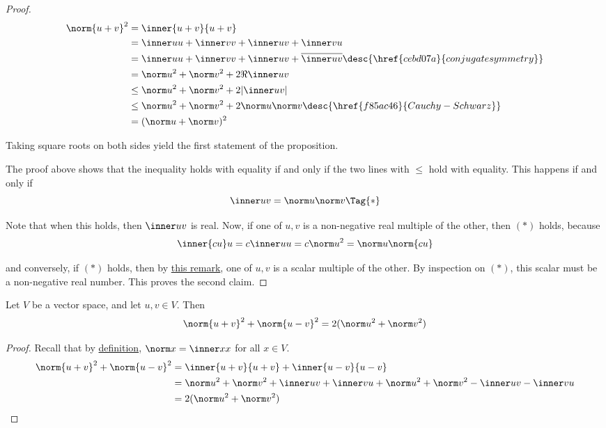 \begin{proof}
  \begin{align*}
    \norm{u+v}^2 &=\inner{u+v}{u+v}                                                                            \\
                 &=\inner uu+\inner vv+\inner uv+\inner vu                                                     \\
                 &=\inner uu+\inner vv+\inner uv+\overline{\inner uv}\desc{\href{cebd07a}{conjugate symmetry}} \\
                 &=\norm u^2+\norm v^2+2\Re\inner uv                                                           \\
                 &\leq\norm u^2+\norm v^2+2|\inner uv|                                                         \\
                 &\leq\norm u^2+\norm v^2+2\norm u\norm v\desc{\href{f85ac46}{Cauchy-Schwarz}}                 \\
                 &=(\norm u+\norm v)^2
  \end{align*}

  Taking square roots on both sides yield the first statement of the
  proposition.

  The proof above shows that the inequality holds with equality if and only if
  the two lines with $\leq$ hold with equality. This happens if and only if
  \begin{equation*}
    \inner uv=\norm u\norm v\Tag{*}
  \end{equation*}

  Note that when this holds, then $\inner uv$ is real. Now, if one of $u,v$ is
  a non-negative real multiple of the other, then $(*)$ holds, because
  $$
    \inner{cu}u=c\inner uu=c\norm u^2=\norm u\norm{cu}
  $$

  and conversely, if $(*)$ holds, then by \href{f012e25}{this remark}, one of
  $u,v$ is a scalar multiple of the other. By inspection on $(*)$, this scalar
  must be a non-negative real number. This proves the second claim.
\end{proof}

\label{bfa1e24}

Let $V$ be a vector space, and let $u,v\in V$. Then
$$
  \norm{u+v}^2+\norm{u-v}^2=2(\norm u^2+\norm v^2)
$$

\begin{proof}
  Recall that by \href{d828dac}{definition}, $\norm x=\inner xx$ for all $x\in
  V$.
  \begin{align*}
    \norm{u+v}^2+\norm{u-v}^2 &=\inner{u+v}{u+v}+\inner{u-v}{u-v}                                               \\
                              &=\norm u^2+\norm v^2+\inner uv+\inner vu+\norm u^2+\norm v^2-\inner uv-\inner vu \\
                              &=2(\norm u^2+\norm v^2)
  \end{align*}
\end{proof}
